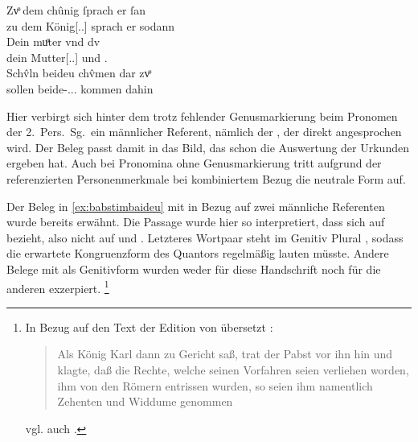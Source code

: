 \begin{exe}
\ex\label{ex:mutterdu}
	\gll Zvͦ dem chûnig ſprach er ſan \textelp{} \\
		zu dem König[\Dat.\Sg.\MascM] sprach er sodann {} \\
\sn \gll Dein muͦter vnd dv \\
		dein Mutter[\Nom.\Sg.\FemF] und \Ssg\subM.\Nom{} \\
\sn \gll Schv̂ln beideu chv̂men {dar zvͦ} \\
		sollen beide-\Nom.\Pl.\NeutMF.\St{} kommen dahin \\
	\begin{taggedline}{\parencite[\pno~23rc,5--14]{kc:B1}}
		\trans {}
	\end{taggedline}
\end{exe}

Hier verbirgt sich hinter dem   trotz fehlender
Genusmarkierung beim Pronomen der 2.\ Pers.\ Sg.\ ein männlicher Referent,
nämlich der  , der direkt angesprochen wird. Der Beleg
passt damit in das Bild, das schon die Auswertung der Urkunden ergeben hat.
Auch bei Pro\-nomina ohne Genusmarkierung tritt aufgrund der referenzierten Personenmerkmale bei kombiniertem Bezug die
neutrale Form auf.

\label{phsec:babstimbaideu}
Der Beleg in \cref{ex:babstimbaideu} mit  in Bezug auf zwei
männliche Referenten wurde bereits erwähnt. Die Passage wurde hier so
interpretiert, dass sich   auf   bezieht, also nicht auf  
\autocite[vgl. zur  Definition][\pno~]{lexer:mhdhwb} und
 . Letzteres Wortpaar steht im Genitiv Plural
\autocite[vgl.][341]{paul2007}, sodass die erwartete Kongruenzform des
Quantors regelmäßig   lauten müsste. Andere Belege
mit  als Genitivform wurden weder für diese Handschrift noch für
die anderen exzerpiert.%
%
	\footnote{In Bezug auf den Text der Edition von
	\nosh\citet{schroeder1895} übersetzt \citet[249]{mayer1874}:
	\blockquote{Als König Karl dann zu Gericht saß, trat der Pabst vor ihn hin
	und klagte, daß die Rechte, welche seinen Vorfahren seien verliehen worden,
	ihm von den Römern entrissen wurden, so seien ihm namentlich Zehenten und
	Widdume genommen}; vgl. auch \citet[83]{weis2022}.}

